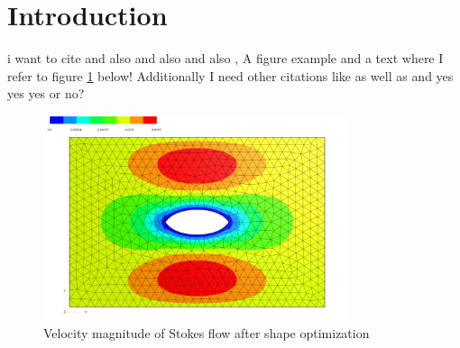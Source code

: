 \section{Introduction}


i want to cite \cite{fully_semi_paper_sturm}
and also \cite{vol_bary_constraint_paper} and also \cite{lecture_notes_sturm} and also \cite{nearly_conformal_paper}, 
A figure example and a text where I refer to figure \ref{shape_opt_plot} below! Additionally I need other citations like \cite{lecture_notes_faustmann_numPDE}
as well as \cite{lecture_notes_faustmann_AMF} and \cite{lecture_notes_melenk_numcomp}
yes yes yes or no?
\begin{figure}[ht]
    \centering
    \includegraphics[width=0.8\textwidth]{figures/solution_shape_opt.PNG}
	\caption{Velocity magnitude of Stokes flow after shape optimization}
	\label{shape_opt_plot}
\end{figure}